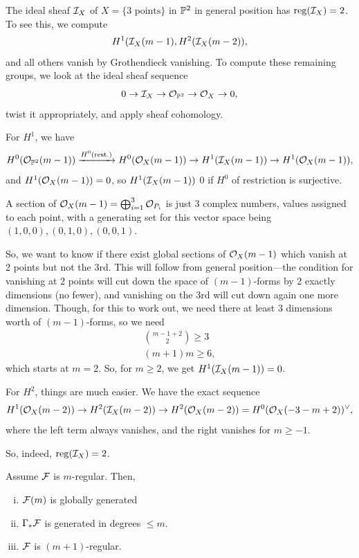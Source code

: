 \documentclass[12pt]{article}
\begin{document}
\begin{eg}
    The ideal sheaf $\cI_X$ of $X=\{\text{3 points}\}$ in $\P^2$ in general position has $\reg(\cI_X)=2$. To see this, we compute
    \[H^1(\cI_X(m-1), H^2(\cI_X(m-2)),\]
    and all others vanish by Grothendieck vanishing. To compute these remaining groups, we look at the ideal sheaf sequence
    \[0\to \cI_X \to \cO_{\P^2} \to \cO_X \to 0,\]
    twist it appropriately, and apply sheaf cohomology.

    For $H^1$, we have
    \[H^0(\cO_{\P^2}(m-1)) \xrightarrow{H^0(\text{rest.})} H^0(\cO_{X}(m-1)) \to H^1(\cI_X(m-1)) \to H^1(\cO_X(m-1)),\]
    and $H^1(\cO_X(m-1))=0$, so $H^1(\cI_X(m-1))$ 0 if $H^0$ of restriction is surjective.

    A section of $\cO_X(m-1) = \bigoplus_{i=1}^3 \cO_{P_i}$ is just 3 complex numbers, values assigned to each point, with a generating set for this vector space being $(1,0,0),(0,1,0),(0,0,1)$.
    
    So, we want to know if there exist global sections of $\cO_X(m-1)$ which vanish at 2 points but not the 3rd. This will follow from general position---the condition for vanishing at 2 points will cut down the space of $(m-1)$-forms by 2 exactly dimensions (no fewer), and vanishing on the 3rd will cut down again one more dimension. Though, for this to work out, we need there at least $3$ dimensions worth of $(m-1)$-forms, so we need
    \begin{align*}
        \binom{m-1+2}{2} \geq 3\\
        (m+1)m \geq 6,
    \end{align*}
    which starts at $m=2$. So, for $m\geq 2$, we get $H^1(\cI_X(m-1))=0$.

    For $H^2$, things are much easier. We have the exact sequence
    \[H^1(\cO_X(m-2)) \to H^2(\cI_X(m-2)) \to H^2(\cO_X(m-2)) = H^0(\cO_X(-3-m+2))^\vee,\]
    where the left term always vanishes, and the right vanishes for $m\geq -1$.

    So, indeed, $\reg(\cI_X)=2$.
\end{eg}

\begin{thm}[Mumford]
    Assume $\cF$ is $m$-regular. Then,
    \begin{enumerate}[(i)]
        \item $\cF(m)$ is globally generated
        \item $\Gamma_* \cF$ is generated in degrees $\leq m$.
        \item $\cF$ is $(m+1)$-regular.
    \end{enumerate}
\end{thm}
\end{document}
